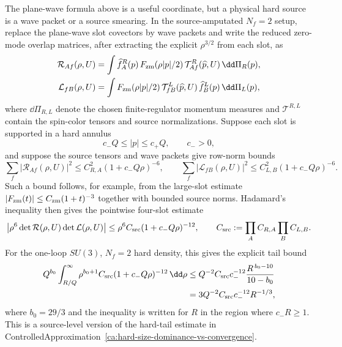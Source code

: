 \begin{controlledapproximation}
\label{ca:instanton-hard-wave-packet-source-support}
The plane-wave formula above is a useful coordinate, but a physical hard
source is a wave packet or a source smearing.  In the source-amputated
\(N_f=2\) setup, replace the plane-wave slot covectors by wave packets and
write the reduced zero-mode overlap matrices, after extracting the explicit
\(\rho^{3/2}\) from each slot, as
\begin{equation}
\begin{aligned}
  \mathcal R_{Af}(\rho,U)
  &=
  \int \widehat f^R_A(p)\,
  F_{\rm zm}(\rho |p|/2)\,
  \mathcal T^R_{Af}(\widehat p,U)\,\dd\Pi_R(p),\\
  \mathcal L_{fB}(\rho,U)
  &=
  \int
  F_{\rm zm}(\rho |p|/2)\,
  \mathcal T^L_{fB}(\widehat p,U)\,
  \widehat f^L_B(p)\,\dd\Pi_L(p),
\end{aligned}
  \label{eq:instanton-wave-packet-zero-mode-overlaps}
\end{equation}
where \(\dd\Pi_{R,L}\) denote the chosen finite-regulator momentum measures
and \(\mathcal T^{R,L}\) contain the spin-color tensors and source
normalizations.  Suppose each slot is supported in a hard annulus
\[
  c_-Q\le |p|\le c_+Q,\qquad c_->0,
\]
and suppose the source tensors and wave packets give row-norm bounds
\begin{equation}
  \sum_f|\mathcal R_{Af}(\rho,U)|^2\le
  C^2_{R,A}(1+c_-Q\rho)^{-6},
  \qquad
  \sum_f|\mathcal L_{fB}(\rho,U)|^2\le
  C^2_{L,B}(1+c_-Q\rho)^{-6}.
  \label{eq:instanton-wave-packet-row-bound}
\end{equation}
Such a bound follows, for example, from the large-slot estimate
\(|F_{\rm zm}(t)|\le C_{\rm zm}(1+t)^{-3}\) together with bounded source
norms.  Hadamard's inequality then gives the pointwise four-slot estimate
\begin{equation}
  \left|
  \rho^6\det\mathcal R(\rho,U)\det\mathcal L(\rho,U)
  \right|
  \le
  \rho^6 C_{\rm src}(1+c_-Q\rho)^{-12},
  \qquad
  C_{\rm src}:=\prod_A C_{R,A}\prod_B C_{L,B}.
  \label{eq:instanton-wave-packet-four-slot-bound}
\end{equation}
For the one-loop \(SU(3)\), \(N_f=2\) hard density, this gives the explicit
tail bound
\begin{equation}
\begin{aligned}
  Q^{b_0}
  \int_{R/Q}^{\infty}
  \rho^{b_0+1}
  C_{\rm src}(1+c_-Q\rho)^{-12}\,\dd\rho
  &\le
  Q^{-2}C_{\rm src}c_-^{-12}
  \frac{R^{\,b_0-10}}{10-b_0}  \\
  &=
  3Q^{-2}C_{\rm src}c_-^{-12}R^{-1/3},
\end{aligned}
  \label{eq:instanton-wave-packet-hard-tail-bound}
\end{equation}
where \(b_0=29/3\) and the inequality is written for \(R\) in the region
where \(c_-R\ge1\).  This is a source-level version of the hard-tail estimate
in ControlledApproximation~\ref{ca:hard-size-dominance-vs-convergence}.


\end{controlledapproximation}

